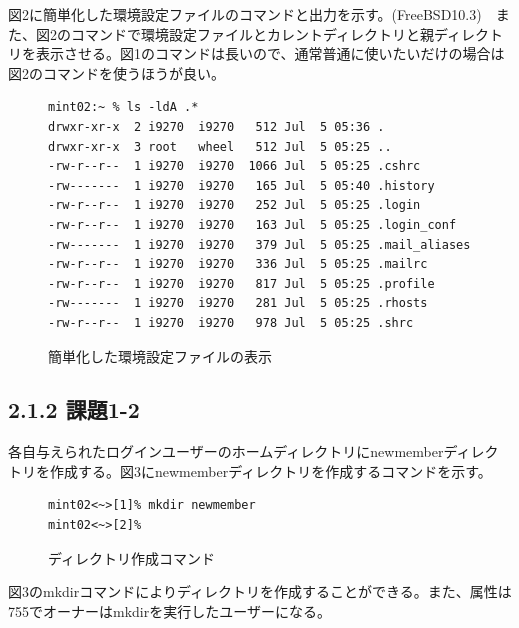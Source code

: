 \documentclass[12pt]{jreport}
\begin{document}
            図2に簡単化した環境設定ファイルのコマンドと出力を示す。(FreeBSD10.3)　また、図2のコマンドで環境設定ファイルとカレントディレクトリと親ディレクトリを表示させる。図1のコマンドは長いので、通常普通に使いたいだけの場合は図2のコマンドを使うほうが良い。
                \begin{figure}[H]
                    \begin{center}
                        \begin{screen}
                            \begin{verbatim}
mint02:~ % ls -ldA .*
drwxr-xr-x  2 i9270  i9270   512 Jul  5 05:36 .
drwxr-xr-x  3 root   wheel   512 Jul  5 05:25 ..
-rw-r--r--  1 i9270  i9270  1066 Jul  5 05:25 .cshrc
-rw-------  1 i9270  i9270   165 Jul  5 05:40 .history
-rw-r--r--  1 i9270  i9270   252 Jul  5 05:25 .login
-rw-r--r--  1 i9270  i9270   163 Jul  5 05:25 .login_conf
-rw-------  1 i9270  i9270   379 Jul  5 05:25 .mail_aliases
-rw-r--r--  1 i9270  i9270   336 Jul  5 05:25 .mailrc
-rw-r--r--  1 i9270  i9270   817 Jul  5 05:25 .profile
-rw-------  1 i9270  i9270   281 Jul  5 05:25 .rhosts
-rw-r--r--  1 i9270  i9270   978 Jul  5 05:25 .shrc
                            \end{verbatim}
                        \end{screen}
                        \caption{簡単化した環境設定ファイルの表示}
                        \label{2}
                    \end{center}
                \end{figure}

            \subsection*{2.1.2 課題1-2}
                各自与えられたログインユーザーのホームディレクトリにnewmemberディレクトリを作成する。図3にnewmemberディレクトリを作成するコマンドを示す。
                \begin{figure}[H]
                    \begin{center}
                        \begin{screen}
                            \begin{verbatim}
mint02<~>[1]% mkdir newmember
mint02<~>[2]%
                            \end{verbatim}
                        \end{screen}
                        \caption{ディレクトリ作成コマンド}
                        \label{3}
                    \end{center}
                \end{figure}
                図3のmkdirコマンドによりディレクトリを作成することができる。また、属性は755でオーナーはmkdirを実行したユーザーになる。
\end{document}
